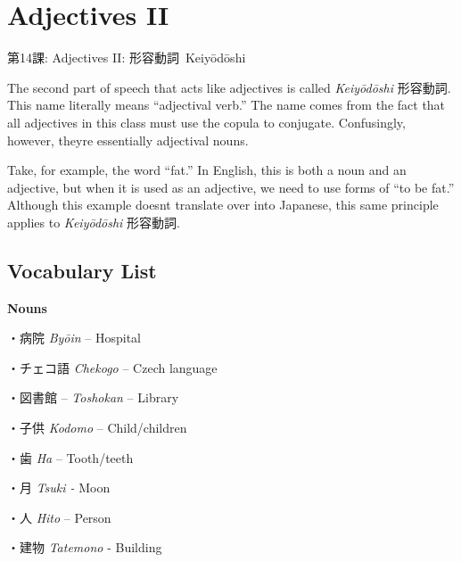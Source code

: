     
\chapter{Adjectives II}

\begin{center}
\begin{Large}
第14課: Adjectives II: 形容動詞 Keiyōdōshi 
\end{Large}
\end{center}
 
\par{ The second part of speech that acts like adjectives is called \emph{Keiyōdōshi }形容動詞. This name literally means “adjectival verb.” The name comes from the fact that all adjectives in this class must use the copula to conjugate. Confusingly, however, they\textquotesingle re essentially adjectival nouns. \hfill\break
}

\par{ Take, for example, the word “fat.” In English, this is both a noun and an adjective, but when it is used as an adjective, we need to use forms of “to be fat.” Although this example doesn\textquotesingle t translate over into Japanese, this same principle applies to \emph{Keiyōdōshi }形容動詞. }
      
\section{Vocabulary List}
 
\par{\textbf{Nouns }}
 
\par{・病院 \emph{Byōin }– Hospital }
 
\par{・チェコ語 \emph{Chekogo }– Czech language }
 
\par{・図書館 – \emph{Toshokan }– Library }
 
\par{・子供 \emph{Kodomo }– Child\slash children }
 
\par{・歯 \emph{Ha }– Tooth\slash teeth }
 
\par{・月 \emph{Tsuki - }Moon }
 
\par{・人 \emph{Hito }– Person }
 
\par{・建物 \emph{Tatemono }- Building }
 
